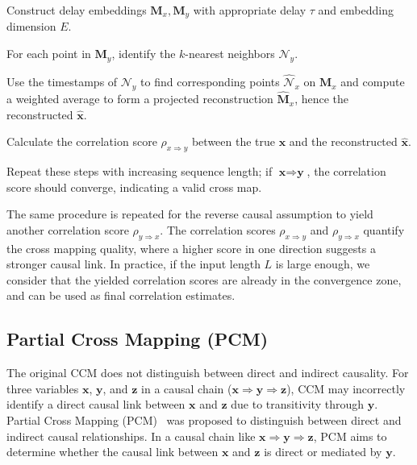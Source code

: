 \begin{enumerate}[label={[\arabic*]}]
    \item Construct delay embeddings $\textbf{M}_x, \textbf{M}_y$ with appropriate delay $\tau$ and embedding dimension $E$.
    \item For each point in $\textbf{M}_y$, identify the $k$-nearest neighbors $\mathcal{N}_y$.
    \item Use the timestamps of $\mathcal{N}_y$ to find corresponding points $\hat{\mathcal{N}}_x$ on $\textbf{M}_x$ and compute a weighted average to form a projected reconstruction $\hat{\textbf{M}}_x$, hence the reconstructed $\hat{\mathbf{x}}$.
    \item Calculate the correlation score $\rho_{x\Rightarrow y}$ between the true $\mathbf{x}$ and the reconstructed $\hat{\mathbf{x}}$.
    \item Repeat these steps with increasing sequence length; if $\textbf{x} \Rightarrow \textbf{y}$, the correlation score should converge, indicating a valid cross map.
\end{enumerate}

The same procedure is repeated for the reverse causal assumption to yield another correlation score $\rho_{y\Rightarrow x}$. The correlation scores $\rho_{x\Rightarrow y}$ and $\rho_{y\Rightarrow x}$ quantify the cross mapping quality, where a higher score in one direction suggests a stronger causal link. In practice, if the input length $L$ is large enough, we consider that the yielded correlation scores are already in the convergence zone, and can be used as final correlation estimates.

\subsection{Partial Cross Mapping (PCM)}
\label{sec:uni-pcm}
The original CCM does not distinguish between direct and indirect causality. For three variables $\textbf{x}$, $\textbf{y}$, and $\textbf{z}$ in a causal chain ($\textbf{x}\Rightarrow\textbf{y}\Rightarrow\textbf{z}$), CCM may incorrectly identify a direct causal link between $\textbf{x}$ and $\textbf{z}$ due to transitivity through $\textbf{y}$. Partial Cross Mapping (PCM)~\citep{leng2020partial,jiang2023partial} was proposed to distinguish between direct and indirect causal relationships. In a causal chain like $\textbf{x}\Rightarrow\textbf{y}\Rightarrow\textbf{z}$, PCM aims to determine whether the causal link between $\textbf{x}$ and $\textbf{z}$ is direct or mediated by $\textbf{y}$.

